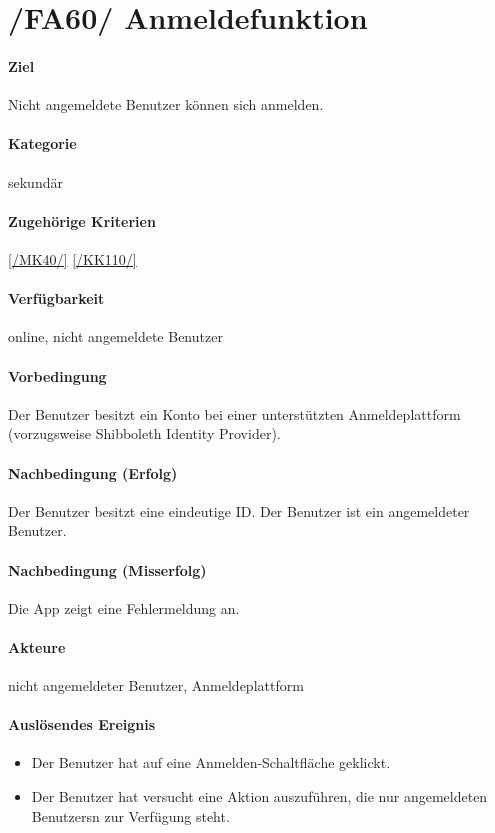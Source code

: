\section[Anmeldefunktion]{/FA60/ Anmeldefunktion}
\label{/FA60/}
\paragraph{Ziel}
Nicht angemeldete \Gls{Benutzer} können sich anmelden.
\paragraph{Kategorie}
sekundär
\paragraph{Zugehörige Kriterien}
\ref{/MK40/} \ref{/KK110/}
\paragraph{Verfügbarkeit}
online, nicht angemeldete Benutzer
\paragraph{Vorbedingung}
Der \Gls{Benutzer} besitzt ein Konto bei einer unterstützten Anmeldeplattform (vorzugsweise Shibboleth Identity Provider).
\paragraph{Nachbedingung (Erfolg)}
Der \Gls{Benutzer} besitzt eine eindeutige \Gls{ID}. Der \Gls{Benutzer} ist ein \dq angemeldeter \Gls{Benutzer}\dq{}.
\paragraph{Nachbedingung (Misserfolg)}
Die App zeigt eine Fehlermeldung an.
\paragraph{Akteure}
nicht angemeldeter \Gls{Benutzer}, Anmeldeplattform
\paragraph{Auslösendes Ereignis}
\begin{itemize}
      \item Der \Gls{Benutzer} hat auf eine \dq Anmelden\dq{}-Schaltfläche geklickt.
      \item Der \Gls{Benutzer} hat versucht eine Aktion auszuführen, die nur angemeldeten \Glspl{Benutzer}n zur Verfügung steht.
\end{itemize}
